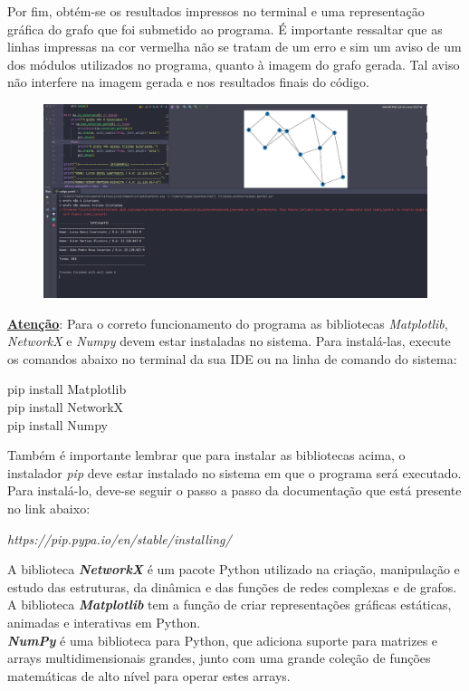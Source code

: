 \documentclass{article}
\begin{document}
 		Por fim, obtém-se os resultados impressos no terminal e uma representação gráfica do grafo que foi submetido ao programa. É importante ressaltar que as linhas impressas na cor vermelha não se tratam de um erro e sim um aviso de um dos módulos utilizados no programa, quanto à imagem do grafo gerada. Tal aviso não interfere na imagem gerada e nos resultados finais do código.
 		
 		\begin{figure}[H]
 			\centering
 			\includegraphics[width=0.9\linewidth]{"Figuras/saida"}
 			\label{fig:saida}
 			\caption{}
 		\end{figure}\vspace*{0.2cm}
 		
 		\textbf{\underline{Atenção}}: Para o correto funcionamento do programa as bibliotecas \textit{Matplotlib}, \textit{NetworkX} e \textit{Numpy} devem estar instaladas no sistema. Para instalá-las, execute os comandos abaixo no terminal da sua IDE ou na linha de comando do sistema:
 		
 		\begin{center}
 			pip install Matplotlib\\
 			pip install NetworkX\\
 			pip install Numpy
 		\end{center}
 		
 		Também é importante lembrar que para instalar as bibliotecas acima, o instalador \textit{pip} deve estar instalado no sistema em que o programa será executado. Para instalá-lo, deve-se seguir o passo a passo da documentação que está presente no link abaixo: 
 		\begin{center}
 			\textit{https://pip.pypa.io/en/stable/installing/}
 		\end{center}\vspace*{0.2cm}
 	
 			A biblioteca \textbf{\textit{NetworkX}} é um pacote Python utilizado na criação, manipulação e estudo das estruturas, da dinâmica e das funções de redes complexas e de grafos.\\
 		
 		A biblioteca \textbf{\textit{Matplotlib}} tem a função de criar representações gráficas estáticas, animadas e interativas em Python.\\
 		
 		\textbf{\textit{NumPy}} é uma biblioteca para Python, que adiciona suporte para matrizes e arrays multidimensionais grandes, junto com uma grande coleção de funções matemáticas de alto nível para operar estes arrays.
 		
\end{document}
